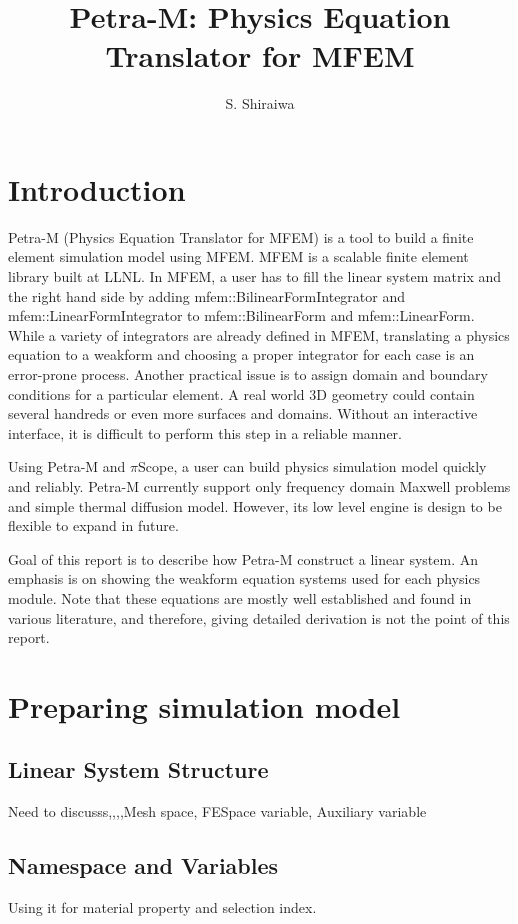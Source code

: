 \documentclass[11pt,a4paper,draft]{report}
\author{S. Shiraiwa}
\title{Petra-M: Physics Equation Translator for MFEM}
\begin{document}
\lstset{language=Python}
\maketitle
\tableofcontents
\newpage

\chapter{Introduction}
Petra-M (Physics Equation Translator for MFEM) is a tool to build a finite element simulation model using MFEM. 
MFEM is a scalable finite element library built at LLNL. In MFEM,  a user has to fill the linear system matrix and the right hand side by adding  mfem::BilinearFormIntegrator and mfem::LinearFormIntegrator to mfem::BilinearForm and mfem::LinearForm.
While a variety of integrators are already defined in MFEM, translating a physics equation to a weakform and choosing a proper integrator for each case is an error-prone process. 
Another practical issue is to assign domain and boundary conditions for a particular element. A real world 3D geometry could contain several handreds or even more surfaces and domains. Without an interactive interface, it is difficult to perform this step in a reliable manner.

Using Petra-M and $\pi$Scope, a user can build physics simulation model quickly and reliably. Petra-M currently support only frequency domain Maxwell problems and simple thermal diffusion model. However, its low level engine is design to be flexible to expand in future.

Goal of this report is to describe how Petra-M construct a linear system. An emphasis is on showing the weakform equation systems used for each physics module. Note that these equations are mostly well established and found in various literature, and therefore, giving detailed derivation is not the point of this report. 


\chapter{Preparing simulation model}
\section{Linear System Structure}
Need to discusss,,,,Mesh space, FESpace variable, Auxiliary variable

\section{Namespace and Variables}
Using it for material property and selection index.
\end{document}
